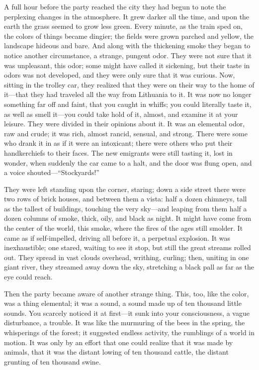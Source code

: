\documentclass[
]{book}
\theoremstyle{definition}
\theoremstyle{definition}
\theoremstyle{definition}
\theoremstyle{definition}
\theoremstyle{remark}
\begin{document}
A full hour before the party reached the city they had begun to note the perplexing changes in the atmosphere. It grew darker all the time, and upon the earth the grass seemed to grow less green. Every minute, as the train sped on, the colors of things became dingier; the fields were grown parched and yellow, the landscape hideous and bare. And along with the thickening smoke they began to notice another circumstance, a strange, pungent odor. They were not sure that it was unpleasant, this odor; some might have called it sickening, but their taste in odors was not developed, and they were only sure that it was curious. Now, sitting in the trolley car, they realized that they were on their way to the home of it---that they had traveled all the way from Lithuania to it. It was now no longer something far off and faint, that you caught in whiffs; you could literally taste it, as well as smell it---you could take hold of it, almost, and examine it at your leisure. They were divided in their opinions about it. It was an elemental odor, raw and crude; it was rich, almost rancid, sensual, and strong. There were some who drank it in as if it were an intoxicant; there were others who put their handkerchiefs to their faces. The new emigrants were still tasting it, lost in wonder, when suddenly the car came to a halt, and the door was flung open, and a voice shouted---``Stockyards!''

They were left standing upon the corner, staring; down a side street there were two rows of brick houses, and between them a vista: half a dozen chimneys, tall as the tallest of buildings, touching the very sky---and leaping from them half a dozen columns of smoke, thick, oily, and black as night. It might have come from the center of the world, this smoke, where the fires of the ages still smolder. It came as if self-impelled, driving all before it, a perpetual explosion. It was inexhaustible; one stared, waiting to see it stop, but still the great streams rolled out. They spread in vast clouds overhead, writhing, curling; then, uniting in one giant river, they streamed away down the sky, stretching a black pall as far as the eye could reach.

Then the party became aware of another strange thing. This, too, like the color, was a thing elemental; it was a sound, a sound made up of ten thousand little sounds. You scarcely noticed it at first---it sunk into your consciousness, a vague disturbance, a trouble. It was like the murmuring of the bees in the spring, the whisperings of the forest; it suggested endless activity, the rumblings of a world in motion. It was only by an effort that one could realize that it was made by animals, that it was the distant lowing of ten thousand cattle, the distant grunting of ten thousand swine.
\end{document}
